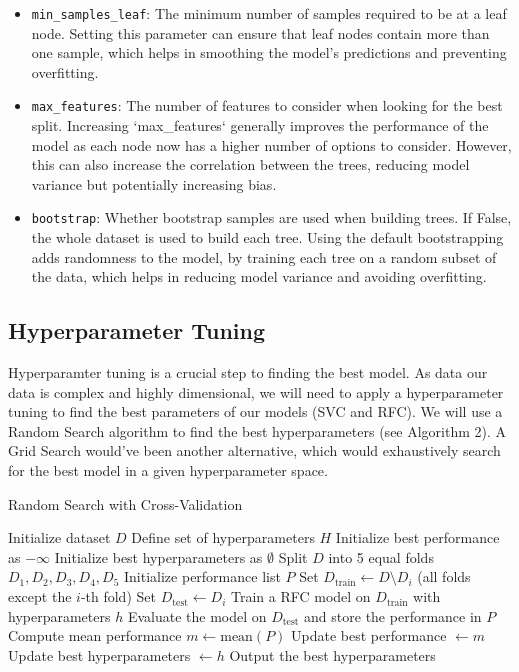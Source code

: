 \documentclass[twocolumn]{article}
\begin{document}
\begin{itemize}
    \item \texttt{min\_samples\_leaf}: The minimum number of samples required to be at a leaf node. Setting this parameter can ensure that leaf nodes contain more than one sample, which helps in smoothing the model's predictions and preventing overfitting.

    \item \texttt{max\_features}: The number of features to consider when looking for the best split. Increasing `max\_features` generally improves the performance of the model as each node now has a higher number of options to consider. However, this can also increase the correlation between the trees, reducing model variance but potentially increasing bias.

    \item \texttt{bootstrap}: Whether bootstrap samples are used when building trees. If False, the whole dataset is used to build each tree. Using the default bootstrapping adds randomness to the model, by training each tree on a random subset of the data, which helps in reducing model variance and avoiding overfitting.
    
\end{itemize}

\subsection{Hyperparameter Tuning}
Hyperparamter tuning is a crucial step to finding the best model. As data our data is complex and highly dimensional, we will need to apply a hyperparameter tuning to find the best parameters of our models (SVC and RFC). We will use a Random Search algorithm to find the best hyperparameters (see Algorithm 2). A Grid Search would've been another alternative, which would exhaustively search for the best model in a given hyperparameter space.   

\newpage

\begin{algorithm}
\caption{Random Search with Cross-Validation}
\begin{algorithmic}[1]
\State Initialize dataset $D$
\State Define set of hyperparameters $H$
\State Initialize best performance as $-\infty$
\State Initialize best hyperparameters as $\emptyset$
    \State Split $D$ into 5 equal folds $D_1, D_2, D_3, D_4, D_5$
    \State Initialize performance list $P$
        \State Set $D_{\text{train}} \gets D \setminus D_i$ (all folds except the $i$-th fold)
        \State Set $D_{\text{test}} \gets D_i$
        \State Train a RFC model on $D_{\text{train}}$ with hyperparameters $h$
        \State Evaluate the model on $D_{\text{test}}$ and store the performance in $P$
    \EndFor
    \State Compute mean performance $m \gets \text{mean}(P)$
        \State Update best performance $ \gets m$
        \State Update best hyperparameters $\gets h$
    \EndIf
\EndFor
\State Output the best hyperparameters
\end{algorithmic}
\end{algorithm}
\end{document}
